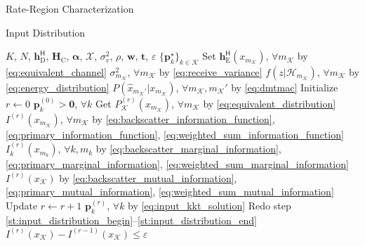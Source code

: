 \documentclass[journal]{IEEEtran}
\begin{document}
\begin{section}{Rate-Region Characterization}
\begin{subsection}{Input Distribution}
		\begin{algorithm}[!t]
			\caption{Numerical \gls{kkt} Input Distribution Evaluation by Limits of Sequence}
			\label{al:input_distribution}
			\begin{algorithmic}[1]
				\Require $K$, $N$, $\boldsymbol{h}_{\text{D}}^\mathsf{H}$, $\boldsymbol{H}_{\text{C}}$, $\boldsymbol{\alpha}$, $\mathcal{X}$, $\sigma_v^2$, $\rho$, $\boldsymbol{w}$, $\boldsymbol{t}$, $\varepsilon$
				\Ensure $\{\boldsymbol{p}_k^\star\}_{k \in \mathcal{K}}$
				\State Set $\boldsymbol{h}_{\text{E}}^\mathsf{H}(x_{m_{\mathcal{K}}})$, $\forall m_{\mathcal{K}}$ by \eqref{eq:equivalent_channel}
				\State \phantom{Set} $\sigma^2_{m_{\mathcal{K}}}$, $\forall m_{\mathcal{K}}$ by \eqref{eq:receive_variance}
				\State \phantom{Set} $f(z|\mathcal{H}_{m_{\mathcal{K}}})$, $\forall m_{\mathcal{K}}$ by \eqref{eq:energy_distribution}
				\State \phantom{Set} $P(\hat{x}_{m_{\mathcal{K}}'}|x_{m_{\mathcal{K}}})$, $\forall m_{\mathcal{K}}, m_{\mathcal{K}}'$ by \eqref{eq:dmtmac}
				\State Initialize $r \gets 0$
				\State \phantom{Initialize} $\boldsymbol{p}_k^{(0)} > \boldsymbol{0}$, $\forall k$
				\State Get $P_{\mathcal{K}}^{(r)}(x_{m_{\mathcal{K}}})$, $\forall m_{\mathcal{K}}$ by \eqref{eq:equivalent_distribution} \label{st:input_distribution_begin}
				\State \phantom{Get} $I^{(r)}(x_{m_{\mathcal{K}}})$, $\forall m_{\mathcal{K}}$ by \eqref{eq:backscatter_information_function}, \eqref{eq:primary_information_function}, \eqref{eq:weighted_sum_information_function}
				\State \phantom{Get} $I^{(r)}_k(x_{m_k})$, $\forall k,m_k$ by \eqref{eq:backscatter_marginal_information}, \eqref{eq:primary_marginal_information}, \eqref{eq:weighted_sum_marginal_information}
				\State \phantom{Get} $I^{(r)}(x_{\mathcal{K}})$ by \eqref{eq:backscatter_mutual_information}, \eqref{eq:primary_mutual_information}, \eqref{eq:weighted_sum_mutual_information} \label{st:input_distribution_end}
				\Repeat
					\State Update $r \gets r+1$
					\State \phantom{Update} $\boldsymbol{p}_k^{(r)}$, $\forall k$ by \eqref{eq:input_kkt_solution}
					\State Redo step \ref{st:input_distribution_begin}--\ref{st:input_distribution_end}
				\Until $I^{(r)}(x_{\mathcal{K}}) - I^{(r-1)}(x_{\mathcal{K}}) \le \varepsilon$
			\end{algorithmic}
		\end{algorithm}
	\end{subsection}


\end{section}
\end{document}
